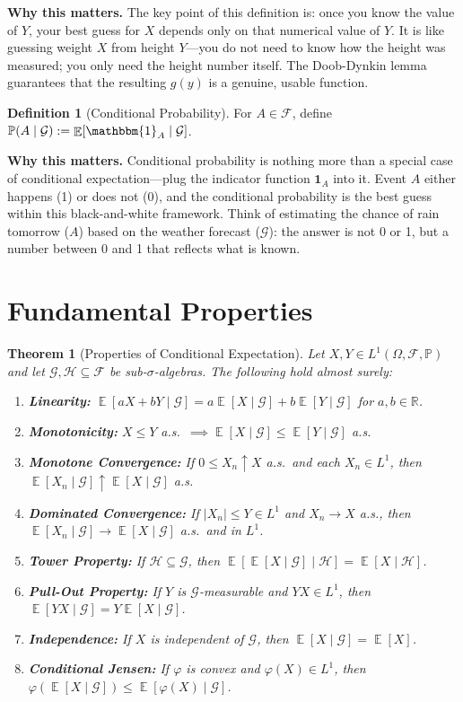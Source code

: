 \documentclass[11pt,a4paper,openany]{book}
\theoremstyle{definition}
\newtheorem{definition}{Definition}[chapter]
\theoremstyle{plain}
\newtheorem{theorem}{Theorem}[chapter]
\theoremstyle{remark}
\DeclareMathOperator{\E}{\mathbb{E}}
\newcommand{\1}{\mathbbm{1}}
\newcommand{\R}{\mathbb{R}}
\newcommand{\F}{\mathcal{F}}
\newcommand{\Pbb}{\mathbb{P}}
\newcommand{\calG}{\mathcal{G}}
\newcommand{\calH}{\mathcal{H}}
\begin{document}
\medskip
\noindent\textbf{Why this matters.} The key point of this definition is: once you know the value of $Y$, your best guess for $X$ depends only on that numerical value of $Y$. It is like guessing weight $X$ from height $Y$---you do not need to know how the height was measured; you only need the height number itself. The Doob-Dynkin lemma guarantees that the resulting $g(y)$ is a genuine, usable function.

\begin{definition}[Conditional Probability]
For $A \in \F$, define $\Pbb(A \mid \calG) := \E[\1_{A} \mid \calG]$.
\end{definition}

\medskip
\noindent\textbf{Why this matters.} Conditional probability is nothing more than a special case of conditional expectation---plug the indicator function $\mathbf{1}_A$ into it. Event $A$ either happens (1) or does not (0), and the conditional probability is the best guess within this black-and-white framework. Think of estimating the chance of rain tomorrow ($A$) based on the weather forecast ($\mathcal{G}$): the answer is not 0 or 1, but a number between 0 and 1 that reflects what is known.

\section{Fundamental Properties}

\begin{theorem}[Properties of Conditional Expectation]
Let $X, Y \in L^{1}(\Omega, \F, \Pbb)$ and let $\calG, \calH \subseteq \F$ be sub-$\sigma$-algebras. The following hold almost surely:
\begin{enumerate}[label=(\arabic*)]
    \item \textbf{Linearity:} $\E[aX + bY \mid \calG] = a \E[X \mid \calG] + b \E[Y \mid \calG]$ for $a, b \in \R$.
    \item \textbf{Monotonicity:} $X \leq Y$ a.s.\ $\implies \E[X \mid \calG] \leq \E[Y \mid \calG]$ a.s.
    \item \textbf{Monotone Convergence:} If $0 \leq X_{n} \uparrow X$ a.s.\ and each $X_{n} \in L^{1}$, then $\E[X_{n} \mid \calG] \uparrow \E[X \mid \calG]$ a.s.
    \item \textbf{Dominated Convergence:} If $|X_{n}| \leq Y \in L^{1}$ and $X_{n} \to X$ a.s., then $\E[X_{n} \mid \calG] \to \E[X \mid \calG]$ a.s.\ and in $L^{1}$.
    \item \textbf{Tower Property:} If $\calH \subseteq \calG$, then $\E[\E[X \mid \calG] \mid \calH] = \E[X \mid \calH]$.
    \item \textbf{Pull-Out Property:} If $Y$ is $\calG$-measurable and $Y X \in L^{1}$, then $\E[Y X \mid \calG] = Y \E[X \mid \calG]$.
    \item \textbf{Independence:} If $X$ is independent of $\calG$, then $\E[X \mid \calG] = \E[X]$.
    \item \textbf{Conditional Jensen:} If $\varphi$ is convex and $\varphi(X) \in L^{1}$, then $\varphi(\E[X \mid \calG]) \leq \E[\varphi(X) \mid \calG]$.
\end{enumerate}
\end{theorem}
\end{document}
